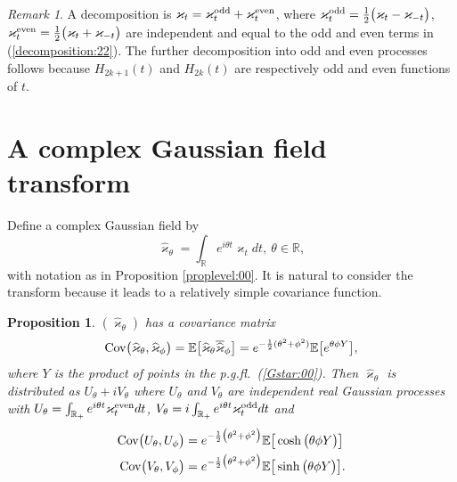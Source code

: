 \documentclass[preprint,11pt]{elsarticle}
\newtheorem{Proposition}{Proposition}
\theoremstyle{remark}
\newtheorem{Remark}{Remark}
\def\spin{{[-1,1]}}
\def\pgfl{\emph{p.g.fl.~}}
\def\odd{{\text{\rm odd}}}
\def\even{{\text{\rm even}}}
\begin{document}
{\begin{Remark}
A decomposition is $\varkappa_t = \varkappa^\odd_t + \varkappa^\even_t$,
where $\varkappa^\odd_t= \frac{1}{2}\big (\varkappa_t - \varkappa_{-t}\big )$,
$\varkappa^\even_t= \frac{1}{2}\big (\varkappa_t + \varkappa_{-t}\big )$ are independent and equal to the odd and even terms in (\ref{decomposition:22}).  The further decomposition into 
odd and even processes follows because $H_{2k+1}(t)$ and $H_{2k}(t)$ are respectively odd and even functions of $t$. %
\end{Remark}
%
\section{A complex Gaussian field transform}
Define a complex Gaussian field by
\begin{equation*}
\widehat{\varkappa}_\theta = \int_{\mathbb{R}} e^{i\theta t}\varkappa_t dt, \ \theta \in \mathbb{R},
\label{complex:001}
\end{equation*}
with notation as in Proposition \ref{proplevel:00}. It is natural to consider the transform because it leads to a relatively simple covariance function.
%
\begin{Proposition}\label{prop:complex}
$(\widehat{\varkappa}_\theta)$ has a covariance matrix
\begin{equation*}
\text{\rm Cov}\big (\widehat{\varkappa}_\theta ,\widehat{\varkappa}_\phi\big )
= \mathbb{E}\big [\widehat{\varkappa}_\theta \overline{\widehat{\varkappa}}_\phi\big ]
= e^{-\frac{1}{2}(\theta^2+\phi^2)}\mathbb{E}\big [e^{\theta\phi Y}\big ], 
\label{complexcv:00}
\end{equation*}
where $Y$ is the product of points in the \pgfl (\ref{Gstar:00}).
Then
$\widehat{\varkappa}_\theta$ is distributed as $U_\theta+iV_\theta$ where $U_\theta$ and $V_\theta$ are independent real Gaussian processes with 
$U_\theta = \int_{\mathbb{R}_+} e^{i\theta t}\varkappa_t^\even dt$,
$V_\theta = i\int_{\mathbb{R}_+} e^{i\theta t}\varkappa_t^\odd dt$
and
\begin{align}
 \text{\rm Cov}\big (U_\theta,U_\phi\big )
 &= 
 e^{-\frac{1}{2}\big (\theta^2+\phi^2\big )}
 \mathbb{E}\big [\cosh\big (\theta\phi Y\big )\big ]\nonumber \\
  \text{\rm Cov}\big (V_\theta,V_\phi\big )
 &= 
 e^{-\frac{1}{2}\big (\theta^2+\phi^2\big )}
\mathbb{E}\big [ \sinh\big (\theta\phi Y\big )\big ].
\label{covoddeven:00}
\end{align}

\end{Proposition}}
\end{document}
